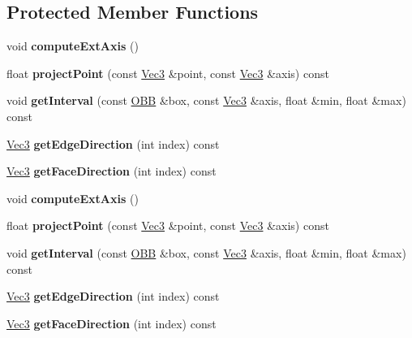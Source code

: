 \subsection*{Protected Member Functions}
\begin{DoxyCompactItemize}
\item 
\mbox{\label{classOBB_a2184f003bfb6fe1432c3a3c694e85133}} 
void {\bfseries compute\+Ext\+Axis} ()
\item 
\mbox{\label{classOBB_acda8428014d10ac4af2894b29e65a4b8}} 
float {\bfseries project\+Point} (const \hyperlink{classVec3}{Vec3} \&point, const \hyperlink{classVec3}{Vec3} \&axis) const
\item 
\mbox{\label{classOBB_aaebc56df31c15e2c43fb1ae3f261c5b3}} 
void {\bfseries get\+Interval} (const \hyperlink{classOBB}{O\+BB} \&box, const \hyperlink{classVec3}{Vec3} \&axis, float \&min, float \&max) const
\item 
\mbox{\label{classOBB_a064b266b1daba1481feedfc3da898e42}} 
\hyperlink{classVec3}{Vec3} {\bfseries get\+Edge\+Direction} (int index) const
\item 
\mbox{\label{classOBB_ac47fb1fa827ae13b9d9168c64d9ead9b}} 
\hyperlink{classVec3}{Vec3} {\bfseries get\+Face\+Direction} (int index) const
\item 
\mbox{\label{classOBB_a2184f003bfb6fe1432c3a3c694e85133}} 
void {\bfseries compute\+Ext\+Axis} ()
\item 
\mbox{\label{classOBB_acda8428014d10ac4af2894b29e65a4b8}} 
float {\bfseries project\+Point} (const \hyperlink{classVec3}{Vec3} \&point, const \hyperlink{classVec3}{Vec3} \&axis) const
\item 
\mbox{\label{classOBB_aaebc56df31c15e2c43fb1ae3f261c5b3}} 
void {\bfseries get\+Interval} (const \hyperlink{classOBB}{O\+BB} \&box, const \hyperlink{classVec3}{Vec3} \&axis, float \&min, float \&max) const
\item 
\mbox{\label{classOBB_a064b266b1daba1481feedfc3da898e42}} 
\hyperlink{classVec3}{Vec3} {\bfseries get\+Edge\+Direction} (int index) const
\item 
\mbox{\label{classOBB_ac47fb1fa827ae13b9d9168c64d9ead9b}} 
\hyperlink{classVec3}{Vec3} {\bfseries get\+Face\+Direction} (int index) const
\end{DoxyCompactItemize}


